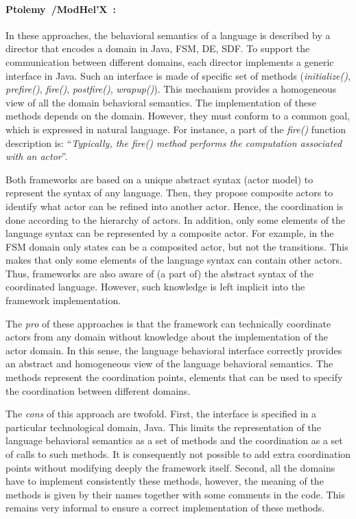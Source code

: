 \paragraph{Ptolemy~\cite{ptoleframebib}/ModHel'X~\cite{modhelxbib}:}
In these approaches, the behavioral semantics of a language is described by a director that encodes a domain in Java, \eg FSM, DE, SDF. To support the communication between different domains, each director implements a generic interface in Java. Such an interface is made of specific set of methods (\eg \emph{initialize()}, \emph{prefire()}, \emph{fire()}, \emph{postfire()}, \emph{wrapup()}). This mechanism provides a homogeneous view of all the domain behavioral semantics. The implementation of these methods depends on the domain. However, they must conform to a common goal, which is expressed in natural language. For instance, a part of the \emph{fire()} function description is: ``\emph{Typically, the fire() method performs the computation associated with an actor}''. 

Both frameworks are based on a unique abstract syntax (\ie actor model) to represent the syntax of any language. Then, they propose composite actors to identify what actor can be refined into another actor. Hence, the coordination is done according to the hierarchy of actors. In addition, only some elements of the language syntax can be represented by a composite actor. For example, in the FSM domain only states can be a composited actor, but not the transitions. This makes that only some elements of the language syntax can contain other actors. Thus, frameworks are also aware of (a part of) the abstract syntax of the coordinated language. However, such knowledge is left implicit into the framework implementation.

The \emph{pro} of these approaches is that the framework can technically coordinate actors from any domain without knowledge about the implementation of the actor domain. In this sense, the language behavioral interface correctly provides an abstract and homogeneous view of the language behavioral semantics. The methods represent the coordination points, \ie elements that can be used to specify the coordination between different domains. 

The \emph{cons} of this approach are twofold. First, the interface is specified in a particular technological domain, \ie Java. This limits the representation of the language behavioral semantics as a set of methods and the coordination as a set of calls to such methods. It is consequently not possible to add extra coordination points without modifying deeply the framework itself. Second, all the domains have to implement consistently these methods, however, the meaning of the methods is given by their names together with some comments in the code. This remains very informal to ensure a correct implementation of these methods.  


